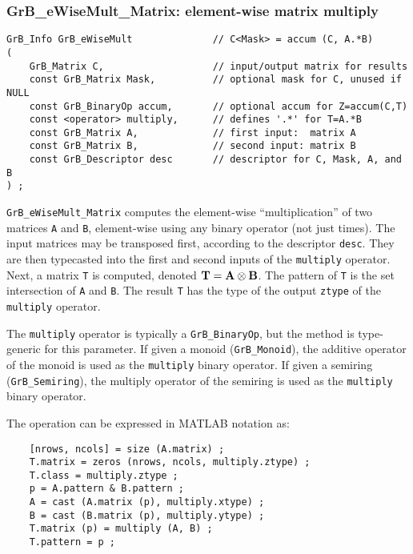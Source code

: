 \documentclass[12pt]{article}
\begin{document}
\newpage
\subsubsection{{\sf GrB\_eWiseMult\_Matrix:} element-wise matrix multiply}
\label{eWiseMult_matrix}

\begin{mdframed}[userdefinedwidth=6in]
{\footnotesize
\begin{verbatim}
GrB_Info GrB_eWiseMult              // C<Mask> = accum (C, A.*B)
(
    GrB_Matrix C,                   // input/output matrix for results
    const GrB_Matrix Mask,          // optional mask for C, unused if NULL
    const GrB_BinaryOp accum,       // optional accum for Z=accum(C,T)
    const <operator> multiply,      // defines '.*' for T=A.*B
    const GrB_Matrix A,             // first input:  matrix A
    const GrB_Matrix B,             // second input: matrix B
    const GrB_Descriptor desc       // descriptor for C, Mask, A, and B
) ;
\end{verbatim}
} \end{mdframed}

\verb'GrB_eWiseMult_Matrix' computes the element-wise ``multiplication'' of two
matrices \verb'A' and \verb'B', element-wise using any binary operator (not
just times).  The input matrices may be transposed first, according to the
descriptor \verb'desc'.  They are then typecasted into the first and second
inputs of the \verb'multiply' operator.  Next, a matrix \verb'T' is computed,
denoted ${\bf T = A \otimes B}$.  The pattern of \verb'T' is the set
intersection of \verb'A' and \verb'B'.  The result \verb'T' has the type of the
output \verb'ztype' of the \verb'multiply' operator.

The \verb'multiply' operator is typically a \verb'GrB_BinaryOp', but the method
is type-generic for this parameter.  If given a monoid (\verb'GrB_Monoid'), the
additive operator of the monoid is used as the \verb'multiply' binary operator.
If given a semiring (\verb'GrB_Semiring'), the multiply operator of the
semiring is used as the \verb'multiply' binary operator.

\vspace{0.05in}
The operation can be expressed in MATLAB notation as:
    {\footnotesize
    \begin{verbatim}
    [nrows, ncols] = size (A.matrix) ;
    T.matrix = zeros (nrows, ncols, multiply.ztype) ;
    T.class = multiply.ztype ;
    p = A.pattern & B.pattern ;
    A = cast (A.matrix (p), multiply.xtype) ;
    B = cast (B.matrix (p), multiply.ytype) ;
    T.matrix (p) = multiply (A, B) ;
    T.pattern = p ; \end{verbatim} }
\end{document}

